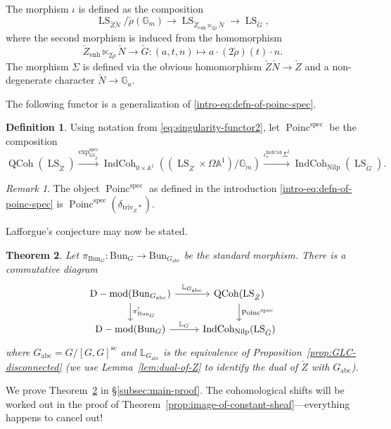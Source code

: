 \documentclass[11pt]{amsart}
\newcommand{\bG}{\mathbb{G}}
\newcommand{\bL}{\mathbb{L}}
\newcommand{\bA}{\mathbb{A}}
\newcommand{\triv}{\mathrm{triv}}
\newcommand{\spec}{\mathrm{spec}}
\newcommand{\Bun}{{\mathrm{Bun}}}
\newcommand{\Poinc}{\operatorname{Poinc}}
\newcommand{\abc}{{\mathrm{abc}}}
\newcommand{\Nilp}{\mathrm{Nilp}}
\DeclareMathOperator{\QCoh}{QCoh}
\DeclareMathOperator{\Dmod}{D-mod}
\DeclareMathOperator{\IndCoh}{IndCoh}
\DeclareMathOperator{\LS}{LS}
\newtheorem{thm}{Theorem}[section]
\theoremstyle{remark}
\newtheorem*{remark}{Remark}
\theoremstyle{definition}
\newtheorem{defn}[thm]{Definition}
\begin{document}
The morphism $\iota$ is defined as the composition
\[
\LS_{\check Z\check N}/\check\rho(\bG_m)\to\LS_{\check Z_{\mathrm{enh}}\ltimes_{2\check\rho}\check N}\to\LS_{\check G},
\]
where the second morphism is induced from the homomorphism
\[\check Z_{\mathrm{enh}}\ltimes_{2\check\rho}\check N\to\check G:(a,t,n)\mapsto a\cdot (2\check\rho)(t)\cdot n.\]
The morphism $\Sigma$ is defined via the obvious homomorphism $\check Z\check N\to\check Z$ and a non-degenerate character $\check N\to\bG_a$. 

The following functor is a generalization of \eqref{intro-eq:defn-of-poinc-spec}.

\begin{defn}
    Using notation from \eqref{eq:singularity-functor2}, let $\Poinc^\spec$ be the composition
\begin{equation}\label{eq:spectral-Poinc-defn}
\QCoh(\LS_{\check Z})\xrightarrow{\exp^\spec_{\LS_{\check Z}}}\IndCoh_{0\times\bA^1}((\LS_{\check Z}\times\Omega\bA^1)/\bG_m)\xrightarrow{\iota^{\IndCoh}_*\Sigma^!}\IndCoh_\Nilp(\LS_{\check G}).
\end{equation}
\end{defn}
\begin{remark}
    The object $\Poinc^\spec$ as defined in the introduction \eqref{intro-eq:defn-of-poinc-spec} is $\Poinc^\spec(\delta_{\triv_{\check Z}*})$.
\end{remark}
Lafforgue's conjecture may now be stated.
\begin{thm}\label{conj:lafforgue-Z}
    Let $\pi_{\Bun_G}\colon\Bun_G\to\Bun_{G_\abc}$ be the standard morphism. There is a commutative diagram
    \begin{equation}\label{eq:main-diagram}
    \begin{tikzcd}
    \Dmod(\Bun_{G_{\mathrm{abc}}})\arrow{r}{\mathbb L_{G_{\mathrm{abc}}}}\arrow{d}{\pi_{\Bun_G}^!}&\QCoh(\LS_{\check Z})\arrow{d}{\Poinc^\spec}\\
        \Dmod(\Bun_G)\arrow{r}{\mathbb L_G}&\IndCoh_\Nilp(\LS_{\check G})
    \end{tikzcd}
    \end{equation}
    where $G_{\mathrm{abc}}=G/[G,G]^{\mathrm{sc}}$ and $\bL_{G_\abc}$ is the equivalence of Proposition~\ref{prop:GLC-disconnected} (we use Lemma~\ref{lem:dual-of-Z} to identify the dual of $\check Z$ with $G_\abc$).
\end{thm}
We prove Theorem~\ref{conj:lafforgue-Z} in \S\ref{subsec:main-proof}. The cohomological shifts will be worked out in the proof of Theorem~\ref{prop:image-of-constant-sheaf}---everything happens to cancel out!
\end{document}
